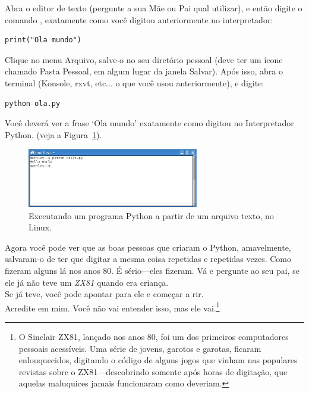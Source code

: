 \begin{LINUX}
Abra o editor de texto (pergunte a sua Mãe ou Pai qual utilizar), e então digite o comando , exatamente como você digitou anteriormente no interpretador:

\begin{listing}
\begin{verbatim}
print("Ola mundo")
\end{verbatim}
\end{listing}

Clique no menu Arquivo, salve-o no seu diretório pessoal (deve ter um ícone chamado Pasta Pessoal, em algum lugar da janela Salvar). Após isso, abra o terminal (Konsole, rxvt, etc... o que você usou anteriormente), e digite:

\begin{listing}
\begin{verbatim}
python ola.py
\end{verbatim}
\end{listing}

Você deverá ver a frase `Ola mundo' exatamente como digitou no Interpretador Python. (veja a Figura~\ref{fig9}).

\begin{figure}
\begin{center}
\includegraphics[width=75mm]{eps/figure9.eps}
\end{center}
\caption{Executando um programa Python a partir de um arquivo texto, no Linux.}\label{fig9}
\end{figure}
\end{LINUX}

Agora você pode ver que as boas pessoas que criaram o Python, amavelmente, salvaram-o de ter que digitar a mesma coisa repetidas e repetidas vezes. Como fizeram alguns lá nos anos 80. É sério---eles fizeram. Vá e pergunte ao seu pai, se ele já não teve um \emph{ZX81} quando era criança.\\

\noindent
Se já teve, você pode apontar para ele e começar a rir.\\

\noindent
Acredite em mim. Você não vai entender isso, mas ele vai.\footnote{O Sinclair ZX81, lançado nos anos 80, foi um dos primeiros computadores pessoais acessíveis. Uma série de jovens, garotos e garotas, ficaram enlouquecidos, digitando o código de alguns jogos que vinham nas populares revistas sobre o ZX81---descobrindo somente após horas de digitação, que aquelas maluquices jamais funcionaram como deveriam.}

